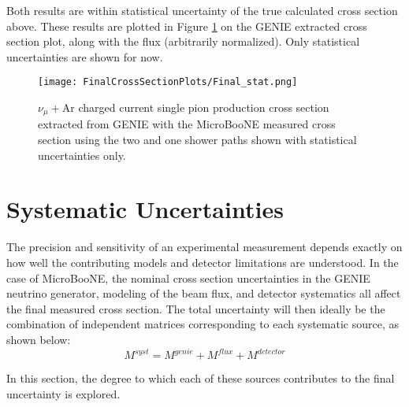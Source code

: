 \noindent Both results are within statistical uncertainty of the true calculated cross section above. These results are plotted in Figure \ref{fig:genie_uboone_xsec} on the GENIE extracted cross section plot, along with the flux (arbitrarily normalized).  Only statistical uncertainties are shown for now.

\begin{figure}[h!]
\centering
\texttt{[image: FinalCrossSectionPlots/Final\_stat.png]}
\caption{ $\nu_{\mu}+\text{Ar}$ charged current single pion production cross section extracted from GENIE with the MicroBooNE measured cross section using the two and one shower paths shown with statistical uncertainties only. }
\label{fig:genie_uboone_xsec}
\end{figure}

\clearpage
\section{Systematic Uncertainties}
The precision and sensitivity of an experimental measurement depends exactly on how well the contributing models and detector limitations are understood. In the case of MicroBooNE, the nominal cross section uncertainties in the GENIE neutrino generator, modeling of the beam flux, and detector systematics all affect the final measured cross section. The total uncertainty will then ideally be the combination of independent matrices corresponding to each systematic source, as shown below:
\begin{equation}
\label{eq:sys_error}
M^{syst} =  M^{genie} + M^{flux} + M^{detector}
\end{equation}

\noindent In this section, the degree to which each of these sources contributes to the final uncertainty is explored. 
